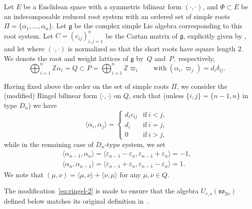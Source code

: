 \documentclass[pdftex]{sigma}
\numberwithin{equation}{section}
\newcommand{\fg}{\mathfrak{g}}
\newcommand{\BZ}{\mathbb{Z}}
\newcommand{\sso}{\mathfrak{so}}
\begin{document}
Let $E$ be a Euclidean space with a symmetric bilinear form $(\cdot ,\cdot)$, and $\Phi \subset E$ be an indecomposable reduced root system with an ordered set of simple roots $\Pi = \{\alpha_{1},\dots ,\alpha_{n}\}$. Let $\mathfrak{g}$ be the complex simple Lie algebra corresponding to this root system.
Let $C = (c_{ij})_{i,j = 1}^{n}$ be the Cartan matrix of $\fg$, explicitly given by , and let  where $(\cdot,\cdot)$ is normalized so that the short roots have square length $2$.
We denote the root and weight lattices of $\fg$ by~$Q$ and~$P$,~respectively,
\begin{displaymath}
 \bigoplus_{i=1}^n \BZ \alpha_i=Q\subset P=\bigoplus_{i=1}^n \BZ \varpi_i
 \qquad \mathrm{with}\ (\alpha_i,\varpi_j)=d_i\delta_{ij}.
\end{displaymath}

Having fixed above the order on the set of simple roots $\Pi$, we consider the (modified) Ringel bilinear form $\langle \cdot ,\cdot \rangle$ on $Q$, such that (unless $\{i,j\}=\{n-1,n\}$ in type $D_n$) we have
\begin{equation}\label{eq:ringel-1}
 \langle \alpha_{i},\alpha_{j}\rangle =
 \begin{cases}
 d_{i}c_{ij} & \text{if}\ i < j, \\
 d_{i} & \text{if}\ i = j ,\\
 0 & \text{if}\ i > j,
 \end{cases}
\end{equation}
while in the remaining case of $D_n$-type system, we set
\begin{gather}
 \langle \alpha_{n-1},\alpha_{n} \rangle =
 \langle \varepsilon_{n-1}-\varepsilon_n,\varepsilon_{n-1}+\varepsilon_n\rangle = -1, \nonumber\\
 \langle \alpha_{n},\alpha_{n-1}\rangle =
 \langle \varepsilon_{n-1}+\varepsilon_n,\varepsilon_{n-1}-\varepsilon_n \rangle = 1.\label{eq:ringel-2}
\end{gather}
We note that $(\mu,\nu) = \langle \mu,\nu \rangle + \langle \nu,\mu \rangle$ for any $\mu,\nu \in Q$.

\begin{Remark}
The modification~\eqref{eq:ringel-2} is made to ensure that the algebra $U_{r,s}(\sso_{2n})$ defined below matches its original definition in~\cite{BGH1}.
\end{Remark}
\end{document}
